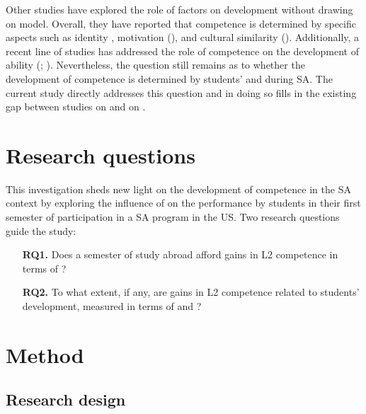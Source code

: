 \documentclass[output=paper]{langsci/langscibook}
\begin{document}
Other studies have explored the role of  factors on  development without drawing on  model. Overall, they have reported that  competence is determined by specific aspects such as identity \citep{Siegal1995}, motivation (\citealt{EslamiAhn2014}), and cultural similarity (\citealt{Bardovi-HarligEtAl2008}). Additionally, a recent line of studies has addressed the role of  competence on the development of  ability (\citealt{Taguchi2015crosscultural}; \citealt{TaguchiEtAl2016}). Nevertheless, the question still remains as to whether the development of  competence is determined by students’  and  during SA. The current study directly addresses this question and in doing so fills in the existing gap between studies on  and on   .

\section{Research questions}
\largerpage
This investigation sheds new light on the development of   competence in the SA context by exploring the influence of  on the  performance by students in their first semester of participation in a SA program in the US. Two research questions guide the study:

\begin{enumerate}
\item[\textbf{RQ1.}] Does a semester of study abroad afford gains in L2 competence in terms of ?
\item[\textbf{RQ2.}] To what extent, if any, are gains in L2  competence related to students’  development, measured in terms of  and ?
\end{enumerate}

\section{Method}

\subsection{Research design}
\end{document}
